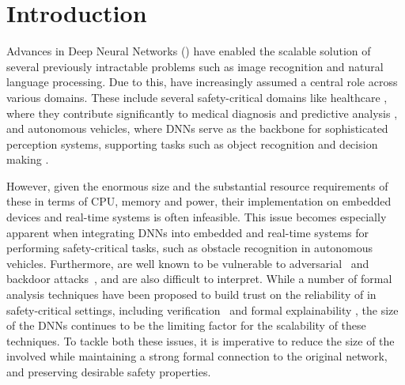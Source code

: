 
\section{Introduction}

Advances in Deep Neural Networks (\dnn) have enabled the scalable solution of
several previously intractable problems such as image recognition and natural
language processing. Due to this, \dnn have increasingly assumed a central role
across various domains. These include several safety-critical domains like
healthcare \cite{b1}, where they contribute significantly to medical diagnosis
and predictive analysis \cite{b2}, and autonomous vehicles, where DNNs serve as
the backbone for sophisticated perception systems, supporting tasks such as
object recognition and decision making \cite{b3}. 

However, given the enormous size and the substantial resource requirements of these \dnn in terms of CPU, memory and power, their implementation on embedded devices and real-time systems is often infeasible. This issue becomes especially apparent when integrating DNNs into embedded and real-time systems for performing safety-critical tasks, such as obstacle recognition in autonomous vehicles. Furthermore, \dnn are well known to be vulnerable to adversarial~\cite{l-bfgs,fgsm,deep-fool,pgd,ground-truth-adv-attack,cw-attack}
and backdoor
attacks~\cite{backdoor-poisoning}, and are also difficult to interpret.
While a number of formal analysis techniques have been proposed to build
trust on the reliability of \dnn in safety-critical settings, including
verification \cite{reluplex,deeppoly,crown,beta-crown,cegar-nn}  and formal
explainability \cite{overview-fxai,minimal-image-fxai}, the size of the DNNs
continues to be the limiting factor for the scalability of these techniques.
To tackle both these issues, it is imperative to reduce the size of the \dnn
involved while maintaining a strong formal connection to the original network, and
preserving desirable safety properties.

